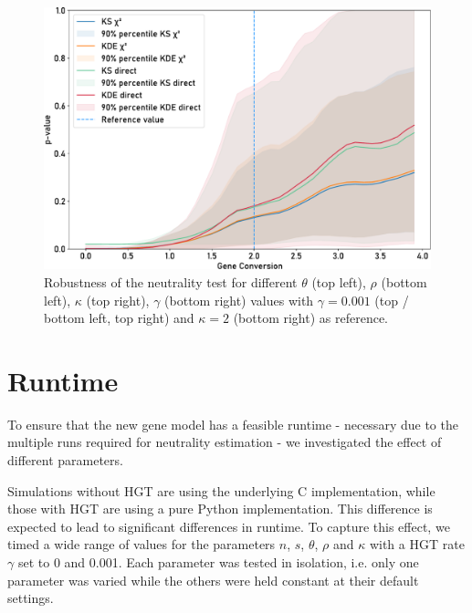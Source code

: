 \begin{figure}[h]
\begin{minipage}{0.49\textwidth}
        \includegraphics[width=\textwidth]{figures/neutrality_test/gc_2_gc.pdf} %
    \end{minipage}
    \caption[Robustness of the neutrality test for $\gamma = 0.001$ and $\kappa = 2$ as reference.]{Robustness of the neutrality test for different $\theta$ (top left), $\rho$ (bottom left), $\kappa$ (top right), $\gamma$ (bottom right) values
        with $\gamma = 0.001$ (top / bottom left, top right) and $\kappa = 2$ (bottom right) as reference.}
    \label{fig:robust_hgt}
\end{figure}


\section{Runtime}
To ensure that the new gene model has a feasible runtime - necessary due to the multiple runs required for neutrality estimation - we investigated the effect of different parameters.

Simulations without \ac{HGT} are using the underlying C implementation, while those with \ac{HGT} are using a pure Python implementation.
This difference is expected to lead to significant differences in runtime.
To capture this effect, we timed a wide range of values for the parameters $n$, $s$, $\theta$, $\rho$ and $\kappa$ with a \ac{HGT} rate $\gamma$ set to 0 and 0.001.
Each parameter was tested in isolation, i.e. only one parameter was varied while the others were held constant at their default settings.

